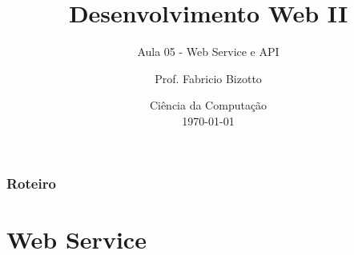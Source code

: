 \documentclass[
	9pt, %
	t, %
]{beamer}
\title[DesWebII]{Desenvolvimento Web II} %
\subtitle{Aula 05 - Web Service e API} %
\author[Fabricio Bizotto]{Prof. Fabricio Bizotto} %
\institute[IFC]{Instituto Federal Catarinense \\ \smallskip \textit{fabricio.bizotto@ifc.edu.br}} %
\date[\today]{Ciência da Computação \\ \today} %
\begin{document}

\begin{frame}
	\titlepage %
\end{frame}


\begin{frame}
	\frametitle{Roteiro} %
	
	\tableofcontents %
\end{frame}


\section{Web Service} %

\end{document}
